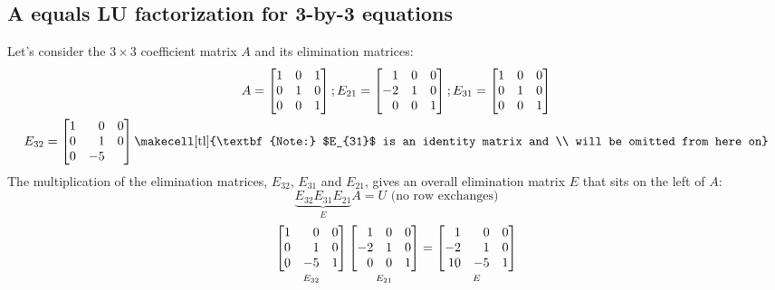 \documentclass[../main.tex]{subfiles}
\begin{document}
\subsection{A equals LU factorization for 3-by-3 equations}
Let's consider the $3 \times 3$ coefficient matrix $A$ and its elimination matrices:
\[
    \begin{gathered}
        A
        =
        \begin{bmatrix*}[r]
            1 & 0 & 1 \\
            0 & 1 & 0 \\
            0 & 0 & 1
        \end{bmatrix*};
        E_{21}
        =
        \begin{bmatrix*}[r]
            1 & 0 & 0 \\
            -2 & 1 & 0 \\
            0 & 0 & 1
        \end{bmatrix*};
        E_{31}
        =
        \begin{bmatrix*}[r]
            1 & 0 & 0 \\
            0 & 1 & 0 \\
            0 & 0 & 1
        \end{bmatrix*} \\
        E_{32}
        =
        \begin{bmatrix*}[r]
            1 & 0 & 0 \\
            0 & 1 & 0 \\
            0 & -5 &
        \end{bmatrix*}
        \text{\makecell[tl]{\textbf{Note:} $E_{31}$ is an identity matrix and \\ will be omitted from here on}}
    \end{gathered}
\]
The multiplication of the elimination matrices, $E_{32}$, $E_{31}$ and $E_{21}$, gives an overall elimination matrix $E$ that sits on the left of $A$:
\[
    \underbrace{E_{32}E_{31}E_{21}}_{E}A = U \text{ (no row exchanges)}
\]
\[
    \underbracket[0pt][0pt]{
        \begin{bmatrix*}[r]
            1 & 0 & 0 \\
            0 & 1 & 0 \\
            0 & -5 & 1
        \end{bmatrix*}
    }_{\mathstrut E_{32}}
    \underbracket[0pt][0pt]{
        \begin{bmatrix*}[r]
            1 & 0 & 0 \\
            -2 & 1 & 0 \\
            0 & 0 & 1
        \end{bmatrix*}
    }_{\mathstrut E_{21}}
    =
    \underbracket[0pt][0pt]{
        \begin{bmatrix*}[r]
            1 & 0 & 0 \\
            -2 & 1 & 0 \\
            10 & -5 & 1
        \end{bmatrix*}
    }_{\mathstrut E}
\]
\end{document}
